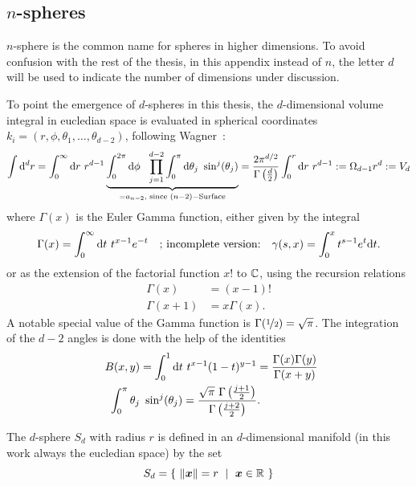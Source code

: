 \documentclass[12pt,a4paper]{report}
\numberwithin{equation}{chapter}
\begin{document}
\begin{appendices}
\clearpage
\chapter{$n$-spheres}\label{section:apx-spheres}
$n$-sphere is the common name for spheres in higher dimensions. To avoid confusion with the rest of the thesis, in this appendix instead of $n$, the letter $d$ will be used to indicate the number of dimensions under discussion.

To point the emergence of $d$-spheres in this thesis, the $d$-dimensional volume integral in eucledian space is evaluated in spherical coordinates $k_i = (r, \phi, \theta_1, \dots, \theta_{d-2})$, following Wagner~\cite{WagnerQFT}:
%
\begin{equation} \label{apx:nrad}
\int \mathrm{d}^dr = \int_0^\infty \mathrm{d} r ~ r^{d-1} \underbrace{\int_0^{2\pi} \mathrm{d} \phi ~~  \prod_{j=1}^{d-2} \int_0^\pi \mathrm{d} \theta_j ~ \sin^j(\theta_j)}_{=a_{n-2}\text{, since }(n-2)-\text{Surface}}
= \frac{2 \pi^{d/2}}{\Gamma\left(\frac d2\right)} \int_0^r \mathrm{d} r ~r^{d-1}
:= \Omega_{d-1} r^d := V_d
\end{equation}
%
where $\Gamma(x)$ is the Euler Gamma function, either given by the integral
\begin{equation}
\Gamma(x) = \int_0^\infty \mathrm{d} t ~ t^{x-1} e^{-t} \quad \text{; incomplete version:} \quad \gamma(s,x) = \int_0^x t^{s-1} e^{t} \mathrm{d} t.
\end{equation}
or as the extension of the factorial function $x!$ to $\mathbb{C}$, using the recursion relations
\begin{equation}
\begin{aligned}
\Gamma(x) &= (x-1)! \\
\Gamma(x+1) &= x \Gamma(x).
\end{aligned}
\end{equation}
A notable special value of the Gamma function is $\Gamma(\nicefrac{1}{2}) = \sqrt{\pi}$. The integration of the $d-2$ angles is done with the help of the identities
\begin{align}
B(x,y) &= \int_0^1 \mathrm{d} t~t^{x-1} (1-t)^{y-1} = \frac{\Gamma(x)\Gamma(y)}{\Gamma(x+y)} \\
\quad \int_0^\pi \theta_j &~ \sin^j(\theta_j) = \frac{\sqrt{\pi}~ \Gamma\left(\frac{j+1}{2}\right)}{\Gamma\left(\frac{j+2}{2}\right)}.
\end{align}

The $d$-sphere $S_d$ with radius $r$ is defined in an $d$-dimensional manifold (in this work always the eucledian space) by the set
\begin{equation}
S_d = \left\{ ~\| \boldsymbol{ x } \| = r  ~\mid~ \boldsymbol{ x } \in \mathbb{R} ~\right\}
\end{equation}


\end{appendices}
\end{document}
